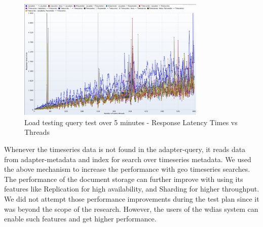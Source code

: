 \begin{figure}[htp]
    \centering
    \includegraphics[width=0.8\textwidth]{results/obs/query/obs_query_5m_response_times_vs_threads.png}
    \caption{Load testing query test over 5 minutes - Response Latency Times vs Threads}
    \label{fi:test_obs_query_5m_response_times_vs_threads}
\end{figure}

Whenever the timeseries data is not found in the adapter-query, it reads data from adapter-metadata and index for search over timeseries metadata. We used the above mechanism to increase the performance with geo timeseries searches. The performance of the document storage can further improve with using its features like Replication for high availability, and Sharding for higher throughput.
We did not attempt those performance improvements during the test plan since it was beyond the scope of the research. However, the users of the \acrshort{wdias} system can enable such features and get higher performance.
